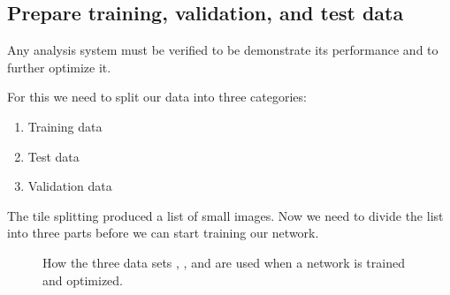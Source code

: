 \documentclass[letterpaper,10pt,english]{sphinxmanual}
\begin{document}
\begin{sphinxVerbatim}[commandchars=\\\{\}]
  
     
    \PYG{p}{[}\PYG{p}{]}\PYG{p}{[}\PYG{p}{]}
    \PYG{p}{[}\PYG{p}{]}\PYG{p}{[}\PYG{p}{]}
\end{sphinxVerbatim}

\noindent{}


\subsection{Prepare training, validation, and test data}
\label{\detokenize{ML4NeutronImageSegmentation:prepare-training-validation-and-test-data}}
Any analysis system must be verified to be demonstrate its performance and to further optimize it.

For this we need to split our data into three categories:
\begin{enumerate}
%
\item {} 
Training data

\item {} 
Test data

\item {} 
Validation data

\end{enumerate}

The tile splitting produced a list of small images. Now we need to divide the list into three parts before we can start training our network.

\begin{figure}[htbp]
\centering
\capstart

\noindent{}
\caption{How the three data sets , , and  are used when a network is trained and optimized.}\label{\detokenize{ML4NeutronImageSegmentation:id17}}\end{figure}
\end{document}
